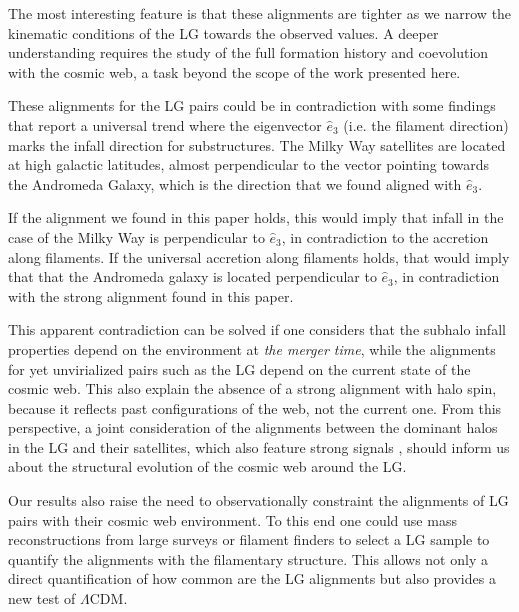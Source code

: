 \documentclass{emulateapj}
\begin{document}
The most interesting feature is that these alignments are
tighter as we narrow the kinematic conditions of the LG towards the
observed values. A deeper understanding requires the study of the full
formation history and coevolution with the cosmic web, a task beyond
the scope of the work presented here.

These alignments for the LG pairs could be in contradiction with
some findings
\citep{2005ApJ...629..219Z,2008MNRAS.390.1133B,2014MNRAS.443.1274L}
that report a universal trend where the eigenvector $\hat{e}_{3}$
(i.e. the filament direction) marks the infall direction for
substructures. The Milky Way satellites are located at high
galactic latitudes, almost perpendicular to the vector pointing
towards the Andromeda Galaxy, which is the direction that we found aligned with
$\hat{e}_3$.  

If the alignment we found in this paper holds, this would imply that
infall in the case of the Milky Way is perpendicular to $\hat{e}_3$,
in contradiction to the accretion along filaments. If the universal accretion
along filaments holds, that would imply that that the Andromeda
galaxy is located perpendicular to $\hat{e}_3$, in contradiction with the strong
alignment found in this paper.  

This apparent contradiction can be solved if one considers that the
subhalo infall properties depend on the environment at {\it the
  merger time}, while the alignments for yet unvirialized pairs such as the LG
depend on the current state of the cosmic web. This also explain the absence
of a strong alignment with halo spin, because it reflects past
configurations of the web, not the current one. From this perspective,
a joint consideration of the alignments between the dominant
halos in the LG and their satellites, which also feature strong
signals \citep{2005A&A...431..517K,2013ApJ...766..120C}, should
inform us about the structural evolution of the cosmic web around the
LG.   

Our results also raise the need to observationally constraint
the alignments of LG pairs with their cosmic web environment. To this end
one could use mass reconstructions from large surveys
\citep{2009MNRAS.394..398W,2011MNRAS.417.1303M,2014arXiv1407.3451W,2014arXiv1406.1004N}
or filament finders \citep{2010MNRAS.407.1449G,2011MNRAS.414..350S}
to select a LG sample to quantify the alignments with the filamentary
structure. 
This allows not only a direct quantification of how common are the LG
alignments but also provides a new test of $\Lambda$CDM. 
\end{document}
